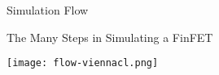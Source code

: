 % 
% 
% 
% 
% 
% 

\begin{frame}{Simulation Flow}
 \begin{block}{The Many Steps in Simulating a FinFET}
  \begin{center}
   \texttt{[image: flow-viennacl.png]}
  \end{center}
 \end{block}
\end{frame}

